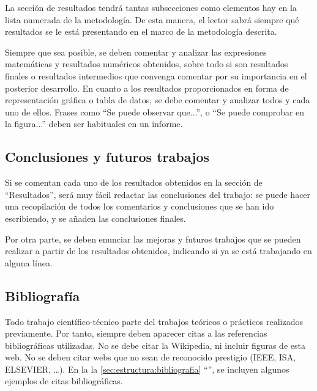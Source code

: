 \documentclass[11pt]{article}
\begin{document}
La sección de resultados tendrá tantas subsecciones como elementos hay en la lista numerada de la metodología. De esta manera, el lector sabrá siempre qué resultados se le está presentando en el marco de la metodología descrita.

Siempre que sea posible, se deben comentar y analizar las expresiones matemáticas y resultados numéricos obtenidos, sobre todo si son resultados finales o resultados intermedios que convenga comentar por su importancia en el posterior desarrollo. En cuanto a los resultados proporcionados en forma de representación gráfica o tabla de datos, se debe comentar y analizar todos y cada uno de ellos. Frases como ``Se puede observar que...'', o ``Se puede comprobar en la figura...'' deben ser habituales en un informe.

\subsection{Conclusiones y futuros trabajos}

Si se comentan cada uno de los resultados obtenidos en la sección de ``Resultados'', será muy fácil redactar las conclusiones del trabajo: se puede hacer una recopilación de todos los comentarios y conclusiones que se han ido escribiendo, y se añaden las conclusiones finales.

Por otra parte, se deben enunciar las mejoras y futuros trabajos que se pueden realizar a partir de los resultados obtenidos, indicando si ya se está trabajando en alguna línea.

\subsection{Bibliografía}
\label{sec:estructura:bibliografia}

Todo trabajo científico-técnico parte del trabajos teóricos o prácticos realizados previamente. Por tanto, siempre deben aparecer citas a las referencias bibliográficas utilizadas. No se debe citar la Wikipedia, ni incluir figuras de esta web. No se deben citar webs que no sean de reconocido prestigio (IEEE, ISA, ELSEVIER, …). En la la \autoref{sec:estructura:bibliografia} ``'', se incluyen algunos ejemplos de citas bibliográficas.


\end{document}
